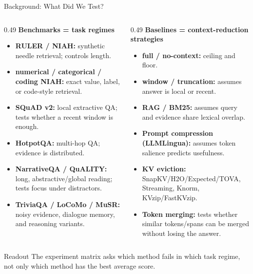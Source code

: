 \begin{frame}{Background: What Did We Test?}
  \scriptsize
  \begin{columns}[T]
    \begin{column}{0.49\textwidth}
      \textbf{Benchmarks = task regimes}
      \begin{itemize}
        \item \textbf{RULER / NIAH:} synthetic needle retrieval; controls length.
        \item \textbf{numerical / categorical / coding NIAH:} exact value, label, or code-style retrieval.
        \item \textbf{SQuAD v2:} local extractive QA; tests whether a recent window is enough.
        \item \textbf{HotpotQA:} multi-hop QA; evidence is distributed.
        \item \textbf{NarrativeQA / QuALITY:} long, abstractive/global reading; tests focus under distractors.
        \item \textbf{TriviaQA / LoCoMo / MuSR:} noisy evidence, dialogue memory, and reasoning variants.
      \end{itemize}
    \end{column}
    \begin{column}{0.49\textwidth}
      \textbf{Baselines = context-reduction strategies}
      \begin{itemize}
        \item \textbf{full / no-context:} ceiling and floor.
        \item \textbf{window / truncation:} assumes answer is local or recent.
        \item \textbf{RAG / BM25:} assumes query and evidence share lexical overlap.
        \item \textbf{Prompt compression (LLMLingua):} assumes token salience predicts usefulness.
        \item \textbf{KV eviction:} SnapKV/H2O/Expected/TOVA, Streaming, Knorm, KVzip/FastKVzip.
        \item \textbf{Token merging:} tests whether similar tokens/spans can be merged without losing the answer.
      \end{itemize}
    \end{column}
  \end{columns}
  \vspace{0.4em}
  \begin{block}{Readout}
    The experiment matrix asks which method fails in which task regime, not only
    which method has the best average score.
  \end{block}
\end{frame}

